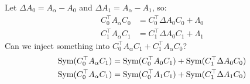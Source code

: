 \documentclass{mynotes}
\begin{document}
Let \( \Delta A_0 = A_\alpha - A_0 \) and \( \Delta A_1 = A_\alpha - A_1 \), so:
\begin{equation}
      \begin{aligned}
            C_0^\top A_\alpha C_0 & = C_0^\top \Delta A_0 C_0 + \Lambda_0 \\
            C_1^\top A_\alpha C_1 & = C_1^\top \Delta A_0 C_1 + \Lambda_1 
      \end{aligned}
\end{equation}
Can we inject something into \( C_0^\top A_\alpha C_1 + C_1^\top A_\alpha C_0 \)?
\begin{equation}
      \begin{aligned}
            \operatorname{Sym}( C_0^\top A_\alpha C_1 ) & = \operatorname{Sym}( C_0^\top A_0 C_1 ) + \operatorname{Sym}( C_1^\top \Delta A_0 C_0 ) \\
            \operatorname{Sym}( C_0^\top A_\alpha C_1 ) & = \operatorname{Sym}( C_0^\top A_1 C_1 ) + \operatorname{Sym}( C_1^\top \Delta A_1 C_0 )
      \end{aligned}
\end{equation}




\newpage
\nocite{*}


\end{document}
